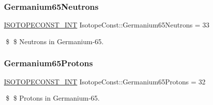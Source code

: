 \subsubsection{\texorpdfstring{Germanium65\+Neutrons}{Germanium65Neutrons}}
{\footnotesize\ttfamily \mbox{\hyperlink{group___isotope_const-_macros_ga5f18360b3e99483a35c32d789e62621c}{I\+S\+O\+T\+O\+P\+E\+C\+O\+N\+S\+T\+\_\+\+I\+NT}} Isotope\+Const\+::\+Germanium65\+Neutrons = 33}

\$ \$ Neutrons in Germanium-\/65. \mbox{\label{group___isotope_const-_germanium-_ge65_ga224e1a4dc5f4e311405a358a7e8b985e}} 
\subsubsection{\texorpdfstring{Germanium65\+Protons}{Germanium65Protons}}
{\footnotesize\ttfamily \mbox{\hyperlink{group___isotope_const-_macros_ga5f18360b3e99483a35c32d789e62621c}{I\+S\+O\+T\+O\+P\+E\+C\+O\+N\+S\+T\+\_\+\+I\+NT}} Isotope\+Const\+::\+Germanium65\+Protons = 32}

\$ \$ Protons in Germanium-\/65. 
